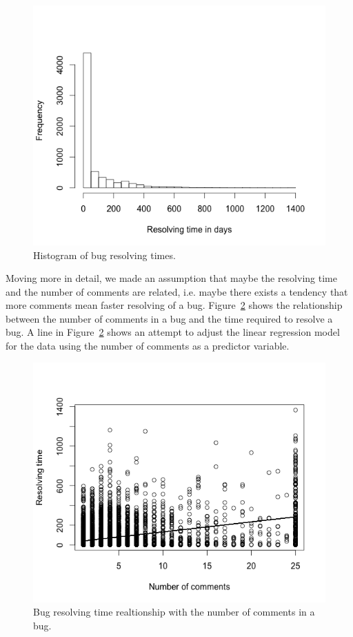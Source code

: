 \documentclass[a4paper,11pt]{report}
\begin{document}
\begin{figure}[ht!]
\centering
\includegraphics[width=.7\textwidth]{diagrams/resolving_times.png}
\caption{Histogram of bug resolving times.}
\label{fig:res_times}
\end{figure}
 
Moving more in detail, we made an assumption that maybe the resolving time and the number of comments are related, i.e. maybe there exists a tendency that more comments mean faster resolving of a bug. Figure~\ref{fig:com_time} shows the relationship between the number of comments in a bug and the time required to resolve a bug. A line in Figure~\ref{fig:com_time} shows an attempt to adjust the linear regression model for the data using the number of comments as a predictor variable.

\begin{figure}[ht!]
\centering
\includegraphics[width=.7\textwidth]{diagrams/comments_time.png}
\caption{Bug resolving time realtionship with the number of comments in a bug.}
\label{fig:com_time}
\end{figure}
\end{document}
